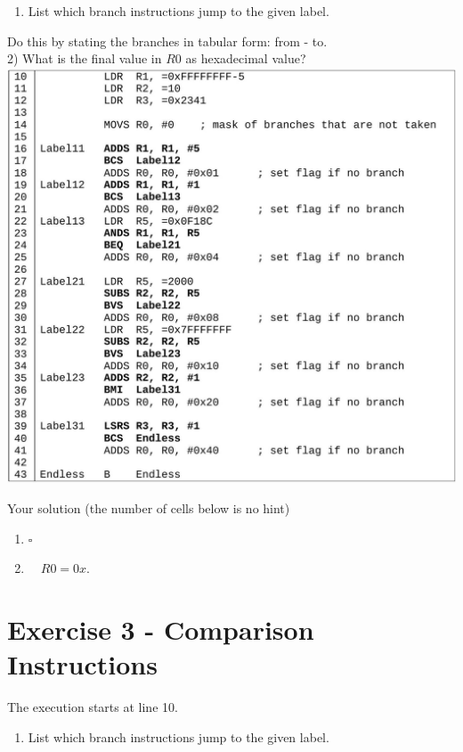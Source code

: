 \documentclass[10pt]{article}
\begin{document}
\begin{enumerate}
  \item List which branch instructions jump to the given label.
\end{enumerate}

Do this by stating the branches in tabular form: from - to.\\
2) What is the final value in $R 0$ as hexadecimal value?\\
\includegraphics[max width=\textwidth, center]{2025_01_02_9902c2d2685de638ef73g-3}

Your solution (the number of cells below is no hint)

\begin{enumerate}
  \item $\square$
  \item $\quad R 0=0 x$. $\qquad$
\end{enumerate}

\section*{Exercise 3 - Comparison Instructions}
The execution starts at line 10.

\begin{enumerate}
  \item List which branch instructions jump to the given label.
\end{enumerate}
\end{document}
